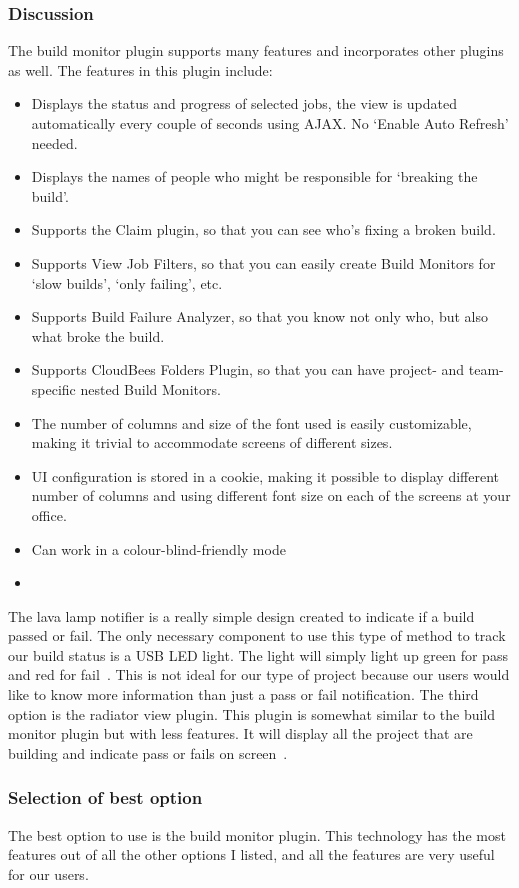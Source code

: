 \documentclass[10pt,letterpaper,onecolumn,draftclsnofoot]{IEEEtran}
\begin{document}
\subsubsection{Discussion}
The build monitor plugin supports many features and incorporates other plugins as well.
The features in this plugin include:
\begin{itemize}
  \item Displays the status and progress of selected jobs, the view is updated automatically every couple of seconds using AJAX\@. No `Enable Auto Refresh' needed.
  \item Displays the names of people who might be responsible for `breaking the build'.
  \item Supports the Claim plugin, so that you can see who's fixing a broken build.
  \item Supports View Job Filters, so that you can easily create Build Monitors for `slow builds', `only failing', etc.
  \item Supports Build Failure Analyzer, so that you know not only who, but also what broke the build.
  \item Supports CloudBees Folders Plugin, so that you can have project- and team-specific nested Build Monitors.
  \item The number of columns and size of the font used is easily customizable, making it trivial to accommodate screens of different sizes.
  \item UI configuration is stored in a cookie, making it possible to display different number of columns and using different font size on each of the screens at your office.
  \item Can work in a colour-blind-friendly mode
  \item~\cite{buildmonitor}
\end{itemize}
The lava lamp notifier is a really simple design created to indicate if a build passed or fail.
The only necessary component to use this type of method to track our build status is a USB LED light.
The light will simply light up green for pass and red for fail~\cite{lavalamp}.
This is not ideal for our type of project because our users would like to know more information than just a pass or fail notification.
The third option is the radiator view plugin.
This plugin is somewhat similar to the build monitor plugin but with less features.
It will display all the project that are building and indicate pass or fails on screen~\cite{radiatorview}.
\subsubsection{Selection of best option}
The best option to use is the build monitor plugin.
This technology has the most features out of all the other options I listed, and all the features are very useful for our users.
\end{document}

